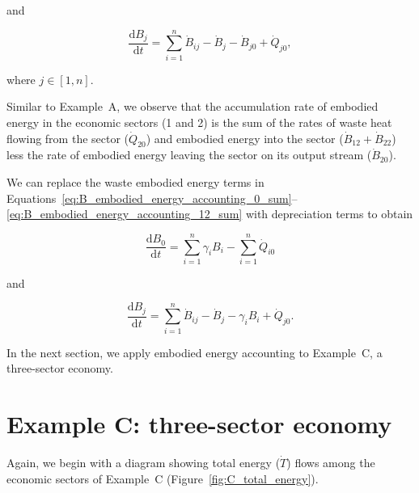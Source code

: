 \noindent and

\begin{equation} \label{eq:B_embodied_energy_accounting_12_sum}
	\frac{\mathrm{d}B_{j}}{\mathrm{d}t} 
	= \sum\limits_{i=1}^n\dot{B}_{ij} 
	- \dot{B}_{j}
	- \dot{B}_{j0} 
	+ \dot{Q}_{j0},
\end{equation}

\noindent where $j \in [1, n]$.

Similar to Example~A, we observe that the accumulation rate 
of embodied energy in the economic sectors (1 and 2) 
is the sum of the rates of waste heat flowing from the sector 
($\dot{Q}_{20}$) and embodied energy into the sector 
($\dot{B}_{12} + \dot{B}_{22}$) 
less the rate of embodied energy leaving the sector 
on its output stream ($\dot{B}_{20}$).

We can replace the waste embodied energy terms in 
Equations~\ref{eq:B_embodied_energy_accounting_0_sum}--\ref{eq:B_embodied_energy_accounting_12_sum}
with depreciation terms to obtain

\begin{equation} \label{eq:B_embodied_energy_accounting_0_with_depreciation}
	\frac{\mathrm{d}B_{0}}{\mathrm{d}t} 
	= \sum\limits_{i=1}^n \gamma_{i}B_{i} 
	- \sum\limits_{i=1}^n\dot{Q}_{i0} 
\end{equation}

\noindent and

\begin{equation} \label{eq:B_embodied_energy_accounting_12_with_depreciation}
	\frac{\mathrm{d}B_{j}}{\mathrm{d}t} 
	= \sum\limits_{i=1}^n\dot{B}_{ij} 
	- \dot{B}_{j}
	- \gamma_{i} B_{i}
	+ \dot{Q}_{j0}.
\end{equation}

In the next section, we apply embodied energy accounting to 
Example~C, a three-sector economy.


\section{Example C: three-sector economy} %

Again, we begin with a diagram showing total energy ($\dot{T}$) flows
among the economic sectors of Example~C (Figure~\ref{fig:C_total_energy}).

